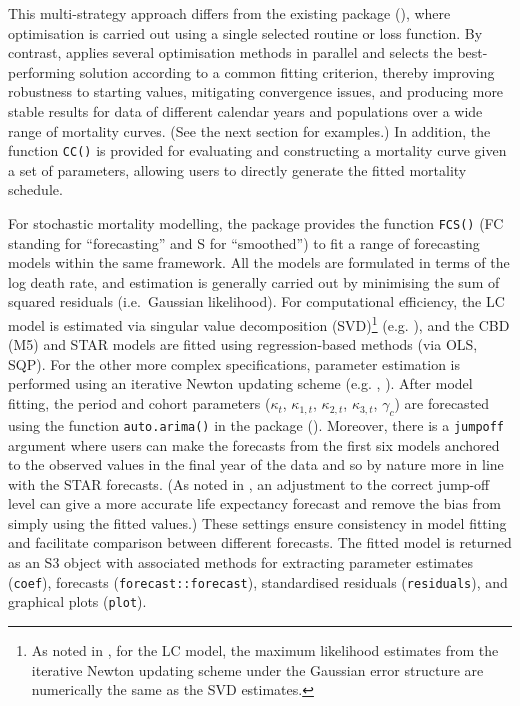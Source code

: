 This multi-strategy approach differs from the existing  package (\citet{Pascariu2025}), where optimisation is carried out using a single selected routine or loss function. By contrast,  applies several optimisation methods in parallel and selects the best-performing solution according to a common fitting criterion, thereby improving robustness to starting values, mitigating convergence issues, and producing more stable results for data of different calendar years and populations over a wide range of mortality curves. (See the next section for examples.) In addition, the function \texttt{CC()} is provided for evaluating and constructing a mortality curve given a set of parameters, allowing users to directly generate the fitted mortality schedule.

For stochastic mortality modelling, the  package provides the function \texttt{FCS()} (FC standing for ``forecasting'' and S for ``smoothed'') to fit a range of forecasting models within the same framework. All the models are formulated in terms of the log death rate, and estimation is generally carried out by minimising the sum of squared residuals (i.e.~Gaussian likelihood). For computational efficiency, the LC model is estimated via singular value decomposition (SVD)\footnote{As noted in \citet{Renshaw2006}, for the LC model, the maximum likelihood estimates from the iterative Newton updating scheme under the Gaussian error structure are numerically the same as the SVD estimates.} (e.g. \citet{Renshaw2006}), and the CBD (M5) and STAR models are fitted using regression-based methods (via OLS, SQP). For the other more complex specifications, parameter estimation is performed using an iterative Newton updating scheme (e.g. \citet{Renshaw2006}, \citet{Li2013}). After model fitting, the period and cohort parameters (\(\kappa_t\), \(\kappa_{1,t}\), \(\kappa_{2,t}\), \(\kappa_{3,t}\), \(\gamma_c\)) are forecasted using the function \texttt{auto.arima()} in the  package (\citet{Hyndman2026}). Moreover, there is a \texttt{jumpoff} argument where users can make the forecasts from the first six models anchored to the observed values in the final year of the data and so by nature more in line with the STAR forecasts. (As noted in \citet{Lee2001}, an adjustment to the correct jump-off level can give a more accurate life expectancy forecast and remove the bias from simply using the fitted values.) These settings ensure consistency in model fitting and facilitate comparison between different forecasts. The fitted model is returned as an S3 object with associated methods for extracting parameter estimates (\texttt{coef}), forecasts (\texttt{forecast::forecast}), standardised residuals (\texttt{residuals}), and graphical plots (\texttt{plot}).

